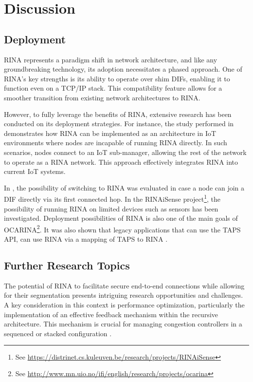 \documentclass{ieeeaccess}
\begin{document}
\section{Discussion} \label{sec:disc}
\subsection{Deployment} 

RINA represents a paradigm shift in network architecture, and like any groundbreaking technology, its adoption necessitates a phased approach. One of RINA's key strengths is its ability to operate over shim DIFs, enabling it to function even on a TCP/IP stack. This compatibility feature allows for a smoother transition from existing network architectures to RINA.

However, to fully leverage the benefits of RINA, extensive research has been conducted on its deployment strategies. For instance, the study performed in \cite{maryan2020} demonstrates how RINA can be implemented as an architecture in IoT environments where nodes are incapable of running RINA directly. In such scenarios, nodes connect to an IoT sub-manager, allowing the rest of the network to operate as a RINA network. This approach effectively integrates RINA into current IoT systems.

In \cite{ciko2019first}, the possibility of switching to RINA was evaluated in case a node can join a DIF directly via its first connected hop. In the RINAiSense project\footnote{See \url{https://distrinet.cs.kuleuven.be/research/projects/RINAiSense}}, the possibility of running RINA on limited devices such as sensors has been investigated. Deployment possibilities of RINA is also one of the main goals of OCARINA\footnote{See \url{http://www.mn.uio.no/ifi/english/research/projects/ocarina}}. It was also shown that legacy applications that can use the TAPS API, can use RINA via a mapping of TAPS to RINA \cite{krist2020taps}.



\subsection{Further Research Topics}
The potential of RINA to facilitate secure end-to-end connections while allowing for their segmentation presents intriguing research opportunities and challenges. A key consideration in this context is performance optimization, particularly the implementation of an effective feedback mechanism within the recursive architecture. This mechanism is crucial for managing congestion controllers in a sequenced or stacked configuration \cite{peymanICC16}.
\end{document}
